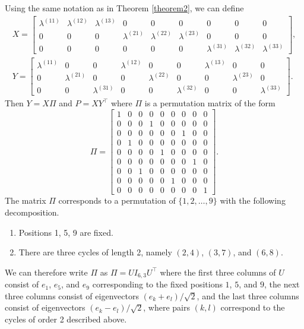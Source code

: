 \documentclass[12pt]{article}
\begin{document}
\begin{example}[$K = 3$] Using the same notation as in Theorem
  \ref{theorem2}, we can define
\begin{gather*}
X = \begin{bmatrix}
\lambda^{(11)} & \lambda^{(12)} & \lambda^{(13)} & 0 & 0 & 0 & 0 & 0 & 0 \\
0 & 0 & 0 & \lambda^{(21)} & \lambda^{(22)} & \lambda^{(23)} & 0 & 0 & 0 \\
0 & 0 & 0 & 0 & 0 & 0 & \lambda^{(31)} & \lambda^{(32)} & \lambda^{(33)}
\end{bmatrix}, \\
Y = \begin{bmatrix}
\lambda^{(11)} & 0 & 0 & \lambda^{(12)} & 0 & 0 & \lambda^{(13)} & 0 & 0 \\
0 & \lambda^{(21)} & 0 & 0 & \lambda^{(22)} & 0 & 0 & \lambda^{(23)} & 0 \\
0 & 0 & \lambda^{(31)} & 0 & 0 & \lambda^{(32)} & 0 & 0 & \lambda^{(33)}
\end{bmatrix}.
\end{gather*}
Then $Y = X \Pi$ and $P = X Y^{\top}$ where $\Pi$ is a permutation matrix of
the form
$$\Pi = \begin{bmatrix}
1 & 0 & 0 & 0 & 0 & 0 & 0 & 0 & 0 \\
0 & 0 & 0 & 1 & 0 & 0 & 0 & 0 & 0 \\
0 & 0 & 0 & 0 & 0 & 0 & 1 & 0 & 0 \\
0 & 1 & 0 & 0 & 0 & 0 & 0 & 0 & 0 \\
0 & 0 & 0 & 0 & 1 & 0 & 0 & 0 & 0 \\
0 & 0 & 0 & 0 & 0 & 0 & 0 & 1 & 0 \\
0 & 0 & 1 & 0 & 0 & 0 & 0 & 0 & 0 \\
0 & 0 & 0 & 0 & 0 & 1 & 0 & 0 & 0 \\
0 & 0 & 0 & 0 & 0 & 0 & 0 & 0 & 1
\end{bmatrix}.$$
The matrix $\Pi$ corresponds to a permutation of $\{1,2,\dots,9\}$
with the following decomposition.
\begin{enumerate}
\item Positions 1, 5, 9 are fixed.
\item There are three cycles of length 2, namely $(2, 4)$, $(3, 7)$, and $(6, 8)$.
\end{enumerate}
We can therefore write $\Pi$ as $\Pi = U I_{6, 3} U^\top$ where the first three
columns of $U$ consist of $e_1$, $e_5$, and $e_9$ corresponding to the fixed
positions $1$, $5$, and $9$, the next three columns consist of eigenvectors
$(e_k + e_l) / \sqrt{2}$, and the last three columns consist of eigenvectors
$(e_k - e_l) / \sqrt{2}$, where pairs $(k, l)$ correspond to the cycles of
order 2 described above.


\end{example}
\end{document}
